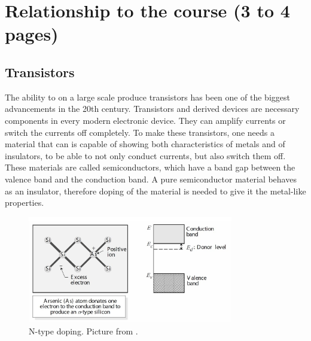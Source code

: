 \section{Relationship to the course (3 to 4 pages)}
% 
% 
% 


\subsection{Transistors}

The ability to on a large scale produce transistors has been one of the biggest advancements in the 20th century. Transistors and derived devices are necessary components in every modern electronic device. They can amplify currents or switch the currents off completely. To make these transistors, one needs a material that can is capable of showing both characteristics of metals and of insulators, to be able to not only conduct currents, but also switch them off. These materials are called semiconductors, which have a band gap between the valence band and the conduction band. A pure semiconductor material behaves as an insulator, therefore doping of the material is needed to give it the metal-like properties.

\begin{figure}[!ht]
 \begin{center}
  \includegraphics[width=0.8\textwidth]{ndoping}
  \caption{N-type doping. Picture from \citet{vanweesbook}.}
  \label{fig:ndoping}
 \end{center}
\end{figure}


